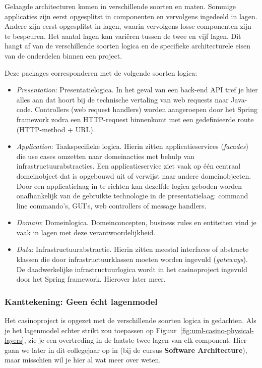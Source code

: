 Gelaagde architecturen komen in verschillende soorten en maten. Sommige applicaties 
zijn eerst opgesplitst in componenten en vervolgens ingedeeld in lagen. Andere zijn 
eerst opgesplitst in lagen, waarin vervolgens losse componenten zijn te bespeuren.
Het aantal lagen kan variëren tussen de twee en vijf lagen. Dit hangt af 
van de verschillende soorten logica en de specifieke architecturele eisen
van de onderdelen binnen een project.

Deze packages corresponderen met de volgende soorten logica:
\begin{itemize}
    \item \emph{Presentation}: Presentatielogica. In het geval van een back-end API tref
    je hier alles aan dat hoort bij de technische vertaling van web requests naar Java-code. 
    Controllers (web request handlers) worden aangeroepen door het Spring framework 
    zodra een HTTP-request binnenkomt met een gedefinieerde route (HTTP-method + URL).
    \item \emph{Application}: Taakspecifieke logica. Hierin zitten applicatieservices (\emph{facades}) 
    die use cases omzetten naar domeinacties met behulp van infrastructuurabstracties. Een applicatieservice
    ziet vaak op één centraal domeinobject dat is opgebouwd uit of verwijst naar andere domeinobjecten.
    Door een applicatielaag in te richten kan dezelfde logica geboden worden onafhankelijk van de gebruikte 
    technologie in de presentatielaag: command line commando's, GUI's, web controllers of message handlers.
    \item \emph{Domain}: Domeinlogica. Domeinconcepten, business rules en entiteiten vind je vaak in lagen 
    met deze verantwoordelijkheid.
    \item \emph{Data}: Infrastructuurabstractie. Hierin zitten meestal interfaces of abstracte klassen die door
    infrastructuurklassen moeten worden ingevuld (\emph{gateways}). De daadwerkelijke infrastructuurlogica 
    wordt in het casinoproject ingevuld door het Spring framework. Hierover later meer.
\end{itemize}

\subsubsection{Kanttekening: Geen écht lagenmodel}
Het casinoproject is opgezet met de verschillende soorten logica in gedachten. 
Als je het lagenmodel echter strikt zou toepassen op Figuur~\ref{fig:uml-casino-physical-layers}, 
zie je een overtreding in de laatste twee lagen van elk component. 
Hier gaan we later in dit collegejaar op in (bij de cursus \textbf{Software Architecture}),
maar misschien wil je hier al wat meer over weten.

